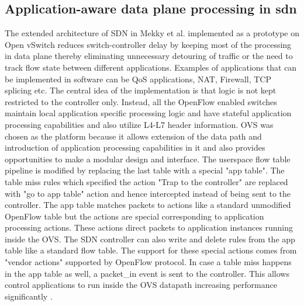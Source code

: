 \documentclass[paper=a4, fontsize=11pt]{scrartcl}	%
\numberwithin{equation}{section}		%
\numberwithin{figure}{section}			%
\numberwithin{table}{section}				%
\begin{document}
\subsection{Application-aware data plane processing in sdn}
The extended architecture of SDN in Mekky et al. implemented as a prototype on Open vSwitch reduces switch-controller delay by keeping most of the processing in data plane thereby eliminating unnecessary detouring of traffic or the need to track flow state between different applications. Examples of applications that can be implemented in software can be QoS applications, NAT, Firewall, TCP splicing etc. The central idea of the implementation is that logic is not kept restricted to the controller only. Instead, all the OpenFlow enabled switches maintain local application specific processing logic and have stateful application processing capabilities and also utilize L4-L7 header information. OVS was chosen as the platform because it allows extension of the data path and introduction of application processing capabilities in it and also provides opportunities to make a modular design and interface. The userspace flow table pipeline is modified by replacing the last table with a special "app table". The table miss rules which specified the action "Trap to the controller" are replaced with "go to app table" action and hence intercepted instead of being sent to the controller. The app table matches packets to actions like a standard unmodified OpenFlow table but the actions are special corresponding to application processing actions. These actions direct packets to application instances running inside the OVS. The SDN controller can also write and delete rules from the app table like a standard flow table. The support for these special actions comes from "vendor actions" supported by OpenFlow protocol. In case a table miss happens in the app table as well, a packet\_in event is sent to the controller. This allows control applications to run inside the OVS datapath increasing performance significantly \cite{dataplane}.

\end{document}
